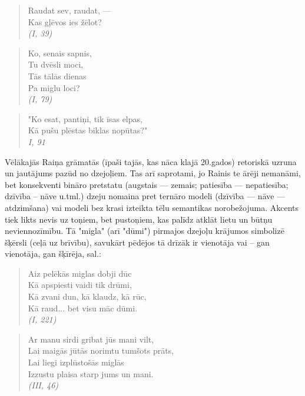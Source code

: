 \documentclass[11pt]{article}
\begin{document}
\begin{quote}
Raudat sev, raudat, ---\\
Kas gļēvos ies žēlot?\\
{\em (I, 39)}
\end{quote}

\begin{quote}
Ko, senais sapnis,\\
Tu dvēsli moci,\\
Tās tālās dienas\\
Pa miglu loci?\\
{\em (I, 79)}
\end{quote}

\begin{quote}
"Ko esat, pantiņi, tik īsas elpas,\\
Kā pušu plēstas biklas nopūtas?"\\
{\em I, 91}
\end{quote}

Vēlākajās Raiņa grāmatās (īpaši tajās, kas
nāca klajā 20.gados) retoriskā uzruna un jautājums
pazūd no dzejoļiem. Tas arī saprotami, jo
Rainis te ārēji nemanāmi, bet konsekventi
bināro pretstatu (augstais --- zemais;
patiesība --- nepatiesība; dzīvība -- nāve u.tml.)
dzeju nomaina pret ternāro modeli (dzīvība ---
nāve --- atdzimšana) vai modeli bez krasi izteikta
tēlu semantikas norobežojuma. Akcents tiek
likts nevis uz toņiem, bet pustoņiem, kas palīdz
atklāt lietu un būtņu neviennozīmību. Tā "migla"
(arī "dūmi") pirmajos dzejoļu krājumos simbolizē
šķērsli (ceļā uz brīvību), savukārt pēdējos
tā drīzāk ir vienotāja vai -- gan vienotāja,
gan šķīrēja, sal.:

\begin{quote}
Aiz pelēkās miglas dobji dūc\\
Kā apspiesti vaidi tik drūmi,\\
Kā zvani dun, kā klaudz, kā rūc,\\
Kā raud... bet visu māc dūmi.\\
{\em (I, 221)}
\end{quote}

\begin{quote}
Ar manu sirdi gribat jūs mani vilt,\\
Lai maigās jūtās norimtu tumšots prāts,\\
Lai liegi izplūstošās miglās\\
Izzustu plaisa starp jums un mani.\\
{\em (III, 46)}
\end{quote}
\end{document}
